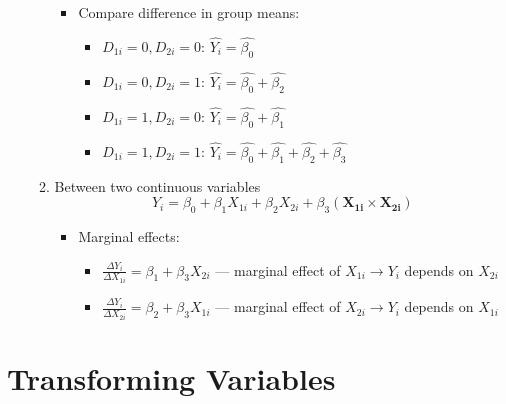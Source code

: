 \documentclass{article}
\begin{document}
\begin{itemize}
\begin{enumerate}
\begin{itemize}
			\item Compare difference in group means:
		\begin{itemize}
			\item $D_{1i}=0, D_{2i}=0$: $\widehat{Y_i}=\hat{\beta_0}$
			\item $D_{1i}=0, D_{2i}=1$: $\widehat{Y_i}=\hat{\beta_0}+\hat{\beta_2}$
			\item $D_{1i}=1, D_{2i}=0$: $\widehat{Y_i}=\hat{\beta_0}+\hat{\beta_1}$
			\item $D_{1i}=1, D_{2i}=1$: $\widehat{Y_i}=\hat{\beta_0}+\hat{\beta_1}+\hat{\beta_2}+\hat{\beta_3}$
		\end{itemize}
		\end{itemize}
		\item Between two continuous variables
		\begin{equation*}
		Y_i=\beta_0+\beta_1X_{1i}+\beta_2X_{2i}+\beta_3\mathbf{(X_{1i} \times X_{2i})}	
		\end{equation*}
		\begin{itemize}
			\item Marginal effects: 
			\begin{itemize}
			\item $\displaystyle\frac{\Delta Y_i}{\Delta X_{1i}}=\beta_1+\beta_3 X_{2i}$ --- marginal effect of $X_{1i} \rightarrow Y_i$ depends on $X_{2i}$
			\item $\displaystyle\frac{\Delta Y_i}{\Delta X_{2i}}=\beta_2+\beta_3 X_{1i}$ --- marginal effect of $X_{2i} \rightarrow Y_i$ depends on $X_{1i}$
			\end{itemize} 
		\end{itemize}
	\end{enumerate}
\end{itemize}

\clearpage 

\section*{Transforming Variables}
\end{document}
